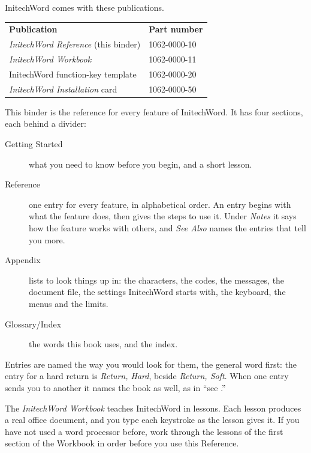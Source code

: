 InitechWord comes with these publications.
\par\addvspace{4pt}
\noindent\begin{tabular}{@{}ll@{}}
\textbf{Publication} & \textbf{Part number}\\
\textit{InitechWord Reference} (this binder) & 1062-0000-10\\
\textit{InitechWord Workbook} & 1062-0000-11\\
InitechWord function-key template & 1062-0000-20\\
\textit{InitechWord Installation} card & 1062-0000-50\\
\end{tabular}
\par\addvspace{4pt}

This binder is the reference for every feature of InitechWord.  It has four
sections, each behind a divider:
\begin{description}
\item[Getting Started] what you need to know before you begin, and a short
lesson.
\item[Reference] one entry for every feature, in alphabetical order.  An
entry begins with what the feature does, then gives the steps to use it.
Under \textit{Notes} it says how the feature works with others, and
\textit{See Also} names the entries that tell you more.
\item[Appendix] lists to look things up in: the characters, the codes, the
messages, the document file, the settings InitechWord starts with, the
keyboard, the menus and the limits.
\item[Glossary/Index] the words this book uses, and the index.
\end{description}
Entries are named the way you would look for them, the general word first:
the entry for a hard return is \textit{Return, Hard}, beside \textit{Return,
Soft}.  When one entry sends you to another it names the book as well, as in
``see .''

The \textit{InitechWord Workbook} teaches InitechWord in lessons.  Each
lesson produces a real office document, and you type each keystroke as the
lesson gives it.  If you have not used a word processor before, work through
the lessons of the first section of the Workbook in order before you use
this Reference.

